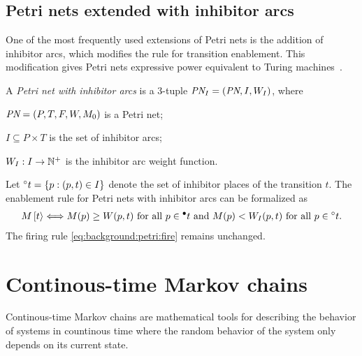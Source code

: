 \subsection{Petri nets extended with inhibitor arcs}

One of the most frequently used extensions of Petri nets is the
addition of inhibitor arcs, which modifies the rule for transition
enablement. This modification gives Petri nets expressive power
equivalent to Turing
machines~\citep{DBLP:conf/apn/Chrzastowski-Wachtel99}.

\begin{dfn}
  A \emph{Petri net with inhibitor arcs} is a 3-tuple $\textit{PN}_I = (\textit{PN},
  I, W_I)$, where
  \begin{asparaitem}
  \item $\textit{PN} = (P, T, F, W, M_0)$ is a Petri net;
  \item $I \subseteq P \times T$ is the set of inhibitor arcs;
  \item $W_I: I \to \mathbb{N}^{+}$ is the inhibitor arc weight function.
  \end{asparaitem}
\end{dfn}

Let $\prescript{\circ}{}{t} = \{ p : (p, t) \in I\}$ denote the set of inhibitor
places of the transition $t$. The enablement rule for Petri nets with
inhibitor arcs can be formalized as
\begin{equation}
  \label{eq:background:petri:inh-fire}
  M\,\mathbin{[t\rangle} \Longleftrightarrow \text{\strut$M(p) \ge W(p, t)$ for all
    $p \in \prescript{\bullet}{}{t}$ and $M(p) < W_I(p, t)$ for all $p \in
    \prescript{\circ}{}{t}$.}
\end{equation}
The firing rule \eqref{eq:background:petri:fire} remains unchanged.


\section{Continous-time Markov chains}

Continous-time Markov chains are mathematical tools for describing the
behavior of systems in countinous time where the random behavior of
the system only depends on its current state.

